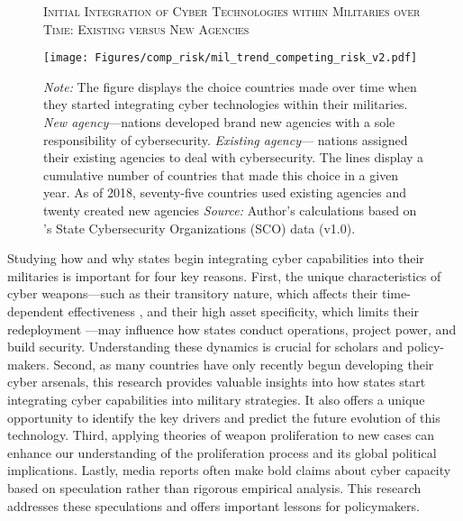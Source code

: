 \documentclass[12pt, letterpaper]{article}
\theoremstyle{plain}
\theoremstyle{remark}
\begin{document}
\begin{figure}[ht]
	\centering
	\caption{\textsc{Initial Integration of Cyber Technologies within Militaries over Time: Existing versus New Agencies}}
	\vspace{2mm}
	\texttt{[image: Figures/comp\_risk/mil\_trend\_competing\_risk\_v2.pdf]}
	\caption*{\footnotesize{
			\textit{Note:} The figure displays the choice countries made over time when they started integrating cyber technologies within their militaries. 
			\textit{New agency}---nations developed brand new agencies with a sole responsibility of cybersecurity. 
			\textit{Existing agency}---%
			nations assigned their existing agencies to deal with cybersecurity.
			The lines display a cumulative number of countries that made this choice in a given year. 
			As of 2018, seventy-five countries used existing agencies and twenty created new agencies 		
			\textit{Source:} Author's calculations based on \citet{Kostyuk2022MoD}'s State Cybersecurity Organizations (SCO) data (v1.0).
		}
		}
	\label{fig:mil_trend}
\end{figure}


Studying how and why states begin integrating cyber capabilities into their militaries is important for four key reasons. First, the unique characteristics of cyber weapons---such as their transitory nature, which affects their time-dependent effectiveness \citep{Buchanan2020TNSR}, and their high asset specificity, which limits their redeployment \citep{Williamson1991ASQ}---may influence how states conduct operations, project power, and build security. Understanding these dynamics is crucial for scholars and policy-makers. Second, as many countries have only recently begun developing their cyber arsenals, this research provides valuable insights into how states start integrating cyber capabilities into military strategies. It also offers a unique opportunity to identify the key drivers and predict the future evolution of this technology. Third, applying theories of weapon proliferation to new cases can enhance our understanding of the proliferation process and its global political implications. Lastly, media reports often make bold claims about cyber capacity based on speculation rather than rigorous empirical analysis. This research addresses these speculations and offers important lessons for policymakers.
\end{document}
